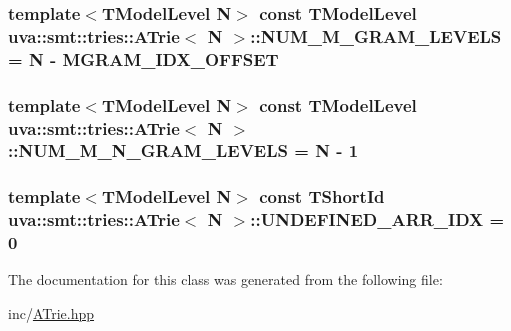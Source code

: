 \subsubsection[{N\+U\+M\+\_\+\+M\+\_\+\+G\+R\+A\+M\+\_\+\+L\+E\+V\+E\+L\+S}]{\setlength{\rightskip}{0pt plus 5cm}template$<$T\+Model\+Level N$>$ const {\bf T\+Model\+Level} {\bf uva\+::smt\+::tries\+::\+A\+Trie}$<$ N $>$\+::N\+U\+M\+\_\+\+M\+\_\+\+G\+R\+A\+M\+\_\+\+L\+E\+V\+E\+L\+S = N -\/ {\bf M\+G\+R\+A\+M\+\_\+\+I\+D\+X\+\_\+\+O\+F\+F\+S\+E\+T}\hspace{0.3cm}{\ttfamily [static]}}\label{classuva_1_1smt_1_1tries_1_1_a_trie_a24132c9483caf8dba629feaed57f61cd}
\hypertarget{classuva_1_1smt_1_1tries_1_1_a_trie_a79334a0fd7b506705033a5bbc2041186}{}
\subsubsection[{N\+U\+M\+\_\+\+M\+\_\+\+N\+\_\+\+G\+R\+A\+M\+\_\+\+L\+E\+V\+E\+L\+S}]{\setlength{\rightskip}{0pt plus 5cm}template$<$T\+Model\+Level N$>$ const {\bf T\+Model\+Level} {\bf uva\+::smt\+::tries\+::\+A\+Trie}$<$ N $>$\+::N\+U\+M\+\_\+\+M\+\_\+\+N\+\_\+\+G\+R\+A\+M\+\_\+\+L\+E\+V\+E\+L\+S = N -\/ 1\hspace{0.3cm}{\ttfamily [static]}}\label{classuva_1_1smt_1_1tries_1_1_a_trie_a79334a0fd7b506705033a5bbc2041186}
\hypertarget{classuva_1_1smt_1_1tries_1_1_a_trie_aac34cbc190b3d5a2d32720a189fe8e72}{}
\subsubsection[{U\+N\+D\+E\+F\+I\+N\+E\+D\+\_\+\+A\+R\+R\+\_\+\+I\+D\+X}]{\setlength{\rightskip}{0pt plus 5cm}template$<$T\+Model\+Level N$>$ const {\bf T\+Short\+Id} {\bf uva\+::smt\+::tries\+::\+A\+Trie}$<$ N $>$\+::U\+N\+D\+E\+F\+I\+N\+E\+D\+\_\+\+A\+R\+R\+\_\+\+I\+D\+X = 0\hspace{0.3cm}{\ttfamily [static]}}\label{classuva_1_1smt_1_1tries_1_1_a_trie_aac34cbc190b3d5a2d32720a189fe8e72}


The documentation for this class was generated from the following file\+:\begin{DoxyCompactItemize}
\item 
inc/\hyperlink{_a_trie_8hpp}{A\+Trie.\+hpp}\end{DoxyCompactItemize}
